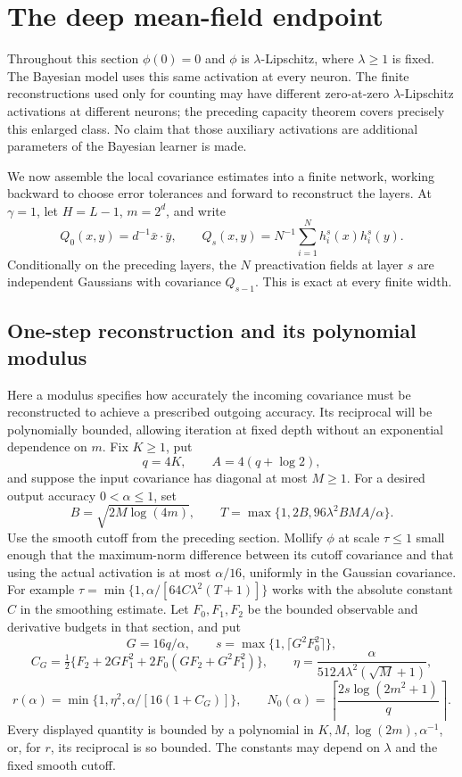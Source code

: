 \section{The deep mean-field endpoint}
\label{sec:meanfield-generic-closure}
Throughout this section $\phi(0)=0$ and $\phi$ is $\lambda$-Lipschitz,
where $\lambda\ge1$ is fixed. The Bayesian model uses this same
activation at every neuron. The finite reconstructions used only for
counting may have different zero-at-zero $\lambda$-Lipschitz activations
at different neurons; the preceding capacity theorem covers precisely
this enlarged class. No claim that those auxiliary activations are
additional parameters of the Bayesian learner is made.

We now assemble the local covariance estimates into a finite network,
working backward to choose error tolerances and forward to reconstruct
the layers. At $\gamma=1$, let $H=L-1$, $m=2^d$, and write
\[
 Q_0(x,y)=d^{-1}\bar x\cdot\bar y,\qquad
 Q_s(x,y)=N^{-1}\sum_{i=1}^Nh_i^s(x)h_i^s(y).
\]
Conditionally on the preceding layers, the $N$ preactivation fields at
layer $s$ are independent Gaussians with covariance $Q_{s-1}$. This is
exact at every finite width.

\subsection{One-step reconstruction and its polynomial modulus}
Here a modulus specifies how accurately the incoming covariance must be
reconstructed to achieve a prescribed outgoing accuracy. Its reciprocal
will be polynomially bounded, allowing iteration at fixed depth without
an exponential dependence on $m$. Fix $K\ge1$, put
\[
 q=4K,\qquad A=4(q+\log2),
\]
and suppose the input covariance has diagonal at most $M\ge1$.
For a desired output accuracy $0<\alpha\le1$, set
\[
 B=\sqrt{2M\log(4m)},\qquad
 T=\max\{1,2B,96\lambda^2BMA/\alpha\}.
\]
Use the smooth cutoff from the preceding section. Mollify $\phi$ at
scale $\tau\le1$ small enough that the maximum-norm difference between
its cutoff covariance and that using the actual activation is at most
$\alpha/16$, uniformly in the Gaussian covariance. For example
$\tau=\min\{1,\alpha/[64C\lambda^2(T+1)]\}$ works with the absolute
constant $C$ in the smoothing estimate. Let $F_0,F_1,F_2$ be the bounded
observable and derivative budgets in that section, and put
\[
 G=16q/\alpha,\qquad
 s=\max\{1,\lceil G^2F_0^2\rceil\},
\]
\[
 C_G=\tfrac12\{F_2+2GF_1^2+2F_0(GF_2+G^2F_1^2)\},\qquad
 \eta=\frac{\alpha}{512A\lambda^2(\sqrt M+1)},
\]
\[
 r(\alpha)=\min\{1,\eta^2,\alpha/[16(1+C_G)]\},\qquad
 N_0(\alpha)=\left\lceil\frac{2s\log(2m^2+1)}q\right\rceil.
\]
Every displayed quantity is bounded by a polynomial in
$K,M,\log(2m),\alpha^{-1}$, or, for $r$, its reciprocal is so bounded.
The constants may depend on $\lambda$ and the fixed smooth cutoff.


